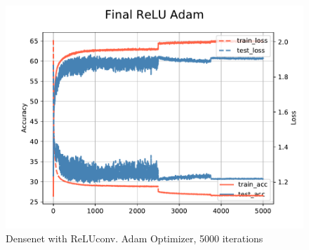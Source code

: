 \documentclass{article}
\begin{document}
\begin{figure}
        \centering
        \includegraphics[width=0.8\linewidth]{figures/RELU5kcifar10.pdf}
        \caption{Densenet with ReLUconv. Adam Optimizer, 5000 iterations}
\end{figure}
\end{document}
